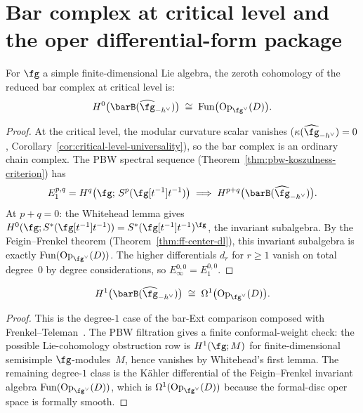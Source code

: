 \section{Bar complex at critical level and the oper differential-form package}
\label{sec:bar-critical}

\begin{theorem}[Zeroth bar cohomology = oper functions;
\ClaimStatusConditional]
\label{thm:oper-bar-h0-dl}
For $\fg$ a simple finite-dimensional Lie algebra, the zeroth
cohomology of the reduced bar complex at critical level is:
\begin{equation}\label{eq:h0-oper}
H^0\bigl(\barB(\widehat{\fg}_{-h^\vee})\bigr)
\;\cong\;
\mathrm{Fun}\bigl(\mathrm{Op}_{\fg^\vee}(D)\bigr).
\end{equation}
\end{theorem}

\begin{proof}
At the critical level, the modular curvature scalar vanishes
($\kappa(\widehat{\fg}_{-h^\vee}) = 0$,
Corollary~\ref{cor:critical-level-universality}), so the bar
complex is an ordinary chain complex.
The PBW spectral sequence
(Theorem~\ref{thm:pbw-koszulness-criterion}) has
\[
E_1^{p,q}
= H^q\bigl(\fg;\, S^p(\fg[t^{-1}]t^{-1})\bigr)
\;\Longrightarrow\;
H^{p+q}\bigl(\barB(\widehat{\fg}_{-h^\vee})\bigr).
\]
At $p + q = 0$: the Whitehead lemma gives
$H^0(\fg; S^*(\fg[t^{-1}]t^{-1})) = S^*(\fg[t^{-1}]t^{-1})^\fg$,
the invariant subalgebra. By the Feigin--Frenkel theorem
(Theorem~\ref{thm:ff-center-dl}), this invariant subalgebra is exactly
$\mathrm{Fun}(\mathrm{Op}_{\fg^\vee}(D))$. The higher
differentials $d_r$ for $r \geq 1$ vanish on total degree~$0$
by degree considerations, so $E_\infty^{0,0} = E_1^{0,0}$.
\end{proof}

\begin{proposition}
\label{prop:oper-bar-h1-dl}
\begin{equation}\label{eq:h1-oper}
H^1\bigl(\barB(\widehat{\fg}_{-h^\vee})\bigr)
\;\cong\;
\Omega^1\bigl(\mathrm{Op}_{\fg^\vee}(D)\bigr).
\end{equation}
\end{proposition}

\begin{proof}
This is the degree-$1$ case of the bar-Ext comparison composed with
Frenkel--Teleman~\cite{FT06}. The PBW filtration gives a finite
conformal-weight check: the possible Lie-cohomology obstruction row
is $H^1(\fg;M)$ for finite-dimensional semisimple
$\fg$-modules~$M$, hence vanishes by Whitehead's first lemma. The
remaining degree-$1$ class is the K\"ahler differential of the
Feigin--Frenkel invariant algebra
$\mathrm{Fun}(\mathrm{Op}_{\fg^\vee}(D))$, which is
$\Omega^1(\mathrm{Op}_{\fg^\vee}(D))$ because the formal-disc oper
space is formally smooth.
\end{proof}

